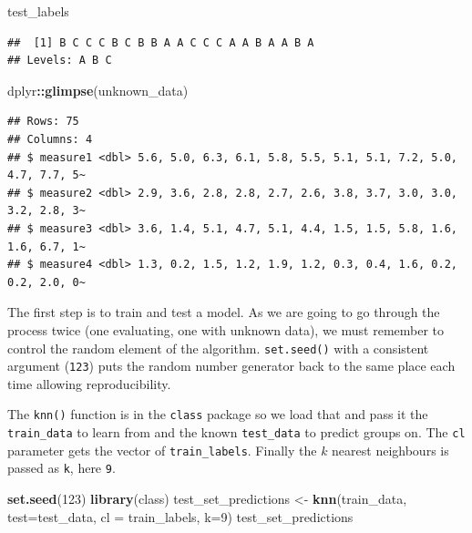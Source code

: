 \documentclass[
]{book}
\newenvironment{Shaded}{\begin{snugshade}}{\end{snugshade}}
\newcommand{\DataTypeTok}[1]{\textcolor[rgb]{0.13,0.29,0.53}{#1}}
\newcommand{\DecValTok}[1]{\textcolor[rgb]{0.00,0.00,0.81}{#1}}
\newcommand{\KeywordTok}[1]{\textcolor[rgb]{0.13,0.29,0.53}{\textbf{#1}}}
\newcommand{\NormalTok}[1]{#1}
\newcommand{\OperatorTok}[1]{\textcolor[rgb]{0.81,0.36,0.00}{\textbf{#1}}}
\newcommand{\StringTok}[1]{\textcolor[rgb]{0.31,0.60,0.02}{#1}}
\begin{document}
\begin{Shaded}
\begin{Highlighting}[]
\NormalTok{test_labels}
\end{Highlighting}
\end{Shaded}

\begin{verbatim}
##  [1] B C C C B C B B A A C C C A A B A A B A
## Levels: A B C
\end{verbatim}

\begin{Shaded}
\begin{Highlighting}[]
\NormalTok{dplyr}\OperatorTok{::}\KeywordTok{glimpse}\NormalTok{(unknown_data)}
\end{Highlighting}
\end{Shaded}

\begin{verbatim}
## Rows: 75
## Columns: 4
## $ measure1 <dbl> 5.6, 5.0, 6.3, 6.1, 5.8, 5.5, 5.1, 5.1, 7.2, 5.0, 4.7, 7.7, 5~
## $ measure2 <dbl> 2.9, 3.6, 2.8, 2.8, 2.7, 2.6, 3.8, 3.7, 3.0, 3.0, 3.2, 2.8, 3~
## $ measure3 <dbl> 3.6, 1.4, 5.1, 4.7, 5.1, 4.4, 1.5, 1.5, 5.8, 1.6, 1.6, 6.7, 1~
## $ measure4 <dbl> 1.3, 0.2, 1.5, 1.2, 1.9, 1.2, 0.3, 0.4, 1.6, 0.2, 0.2, 2.0, 0~
\end{verbatim}

The first step is to train and test a model. As we are going to go through the process twice (one evaluating, one with unknown data), we must remember to control the random element of the algorithm. \texttt{set.seed()} with a consistent argument (\texttt{123}) puts the random number generator back to the same place each time allowing reproducibility.

The \texttt{knn()} function is in the \texttt{class} package so we load that and pass it the \texttt{train\_data} to learn from and the known \texttt{test\_data} to predict groups on. The \texttt{cl} parameter gets the vector of \texttt{train\_labels}. Finally the \(k\) nearest neighbours is passed as \texttt{k}, here \texttt{9}.

\begin{Shaded}
\begin{Highlighting}[]
\KeywordTok{set.seed}\NormalTok{(}\DecValTok{123}\NormalTok{)}
\KeywordTok{library}\NormalTok{(class)}
\NormalTok{test_set_predictions <-}\StringTok{ }\KeywordTok{knn}\NormalTok{(train_data, }\DataTypeTok{test=}\NormalTok{test_data, }\DataTypeTok{cl =}\NormalTok{ train_labels, }\DataTypeTok{k=}\DecValTok{9}\NormalTok{)}
\NormalTok{test_set_predictions}
\end{Highlighting}
\end{Shaded}
\end{document}
